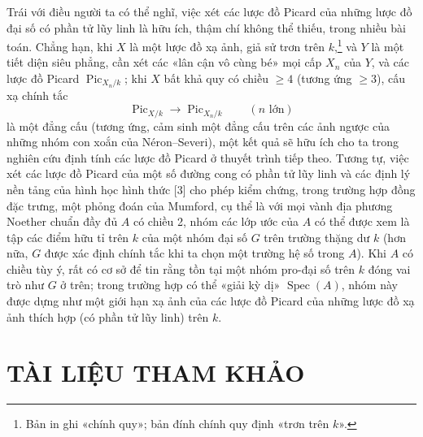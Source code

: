  Trái với điều người ta có thể nghĩ, việc xét các lược đồ
Picard của những lược đồ đại số có phần tử lũy linh là hữu ích, thậm chí không
thể thiếu, trong nhiều bài toán. Chẳng hạn, khi $X$ là một lược đồ xạ ảnh, giả
sử trơn trên $k$,\footnote{Bản in ghi «chính quy»; bản đính chính quy định «trơn
trên $k$».} và $Y$ là một tiết diện siêu phẳng, cần xét các «lân cận vô cùng
bé» mọi cấp $X_n$ của $Y$, và các lược đồ Picard
$\operatorname{Pic}_{X_n/k}$; khi $X$ bất khả quy có chiều $\geq4$ (tương ứng
$\geq3$), cấu xạ chính tắc
\[
\operatorname{Pic}_{X/k}\longrightarrow\operatorname{Pic}_{X_n/k}
\qquad(n\text{ lớn})
\]
là một đẳng cấu (tương ứng, cảm sinh một đẳng cấu trên các ảnh ngược của những
nhóm con xoắn của Néron--Severi), một kết quả sẽ hữu ích cho ta trong nghiên
cứu định tính các lược đồ Picard ở thuyết trình tiếp theo. Tương tự, việc xét
các lược đồ Picard của một số đường cong có phần tử lũy linh và các định lý nền
tảng của hình học hình thức [3] cho phép kiểm chứng, trong trường hợp đồng đặc
trưng, một phỏng đoán của Mumford, cụ thể là với mọi vành địa phương Noether
chuẩn đầy đủ $A$ có chiều 2, nhóm các lớp ước của $A$ có thể được xem là tập
các điểm hữu tỉ trên $k$ của một
nhóm đại số $G$ trên trường thặng dư $k$ (hơn nữa, $G$ được xác định chính tắc
khi ta chọn một trường hệ số trong $A$). Khi $A$ có chiều tùy ý, rất có cơ sở
để tin rằng tồn tại một nhóm pro-đại số trên $k$ đóng vai trò như $G$ ở trên;
trong trường hợp có thể «giải kỳ dị» $\operatorname{Spec}(A)$, nhóm này được
dựng như một giới hạn xạ ảnh của các lược đồ Picard của những lược đồ xạ ảnh
thích hợp (có phần tử lũy linh) trên $k$.

\section*{TÀI LIỆU THAM KHẢO}

